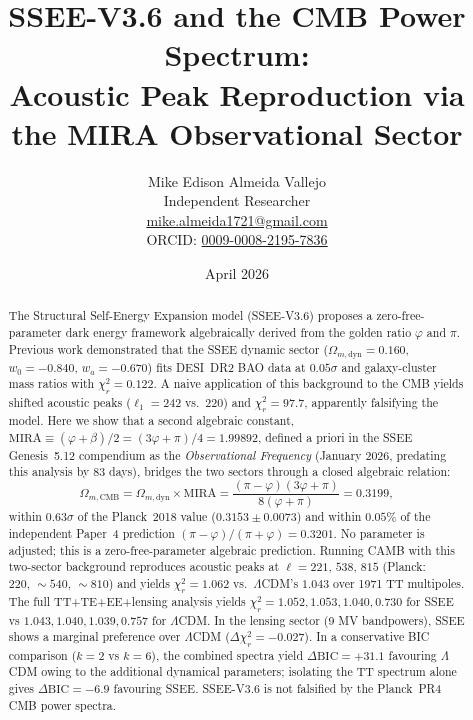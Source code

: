 \documentclass[12pt,a4paper]{article}
\title{\textbf{SSEE-V3.6 and the CMB Power Spectrum:\\
Acoustic Peak Reproduction via the MIRA Observational Sector}}
\author{Mike Edison Almeida Vallejo\\
\small Independent Researcher\\
\small \href{mailto:mike.almeida1721@gmail.com}{mike.almeida1721@gmail.com}\\
\small ORCID: \href{https://orcid.org/0009-0008-2195-7836}{0009-0008-2195-7836}}
\date{April 2026}
\begin{document}
\maketitle

\begin{abstract}
The Structural Self-Energy Expansion model (SSEE-V3.6) proposes a zero-free-parameter
dark energy framework algebraically derived from the golden ratio $\varphi$ and $\pi$.
Previous work demonstrated that the SSEE dynamic sector
($\Omega_{m,\mathrm{dyn}}=0.160$, $w_0=-0.840$, $w_a=-0.670$) fits DESI~DR2 BAO data
at $0.05\sigma$ and galaxy-cluster mass ratios with $\chi^2_r=0.122$.
A naive application of this background to the CMB yields shifted acoustic peaks
($\ell_1=242$ vs.\ $220$) and $\chi^2_r=97.7$, apparently falsifying the model.
Here we show that a second algebraic constant,
$\mathrm{MIRA}\equiv(\varphi+\beta)/2=(3\varphi+\pi)/4=1.99892$,
defined a priori in the SSEE Genesis~5.12 compendium as the
\textit{Observational Frequency} (January 2026, predating this analysis by 83 days),
bridges the two sectors through a closed algebraic relation:
\begin{equation*}
  \Omega_{m,\mathrm{CMB}}
  = \Omega_{m,\mathrm{dyn}} \times \mathrm{MIRA}
  = \frac{(\pi-\varphi)(3\varphi+\pi)}{8(\varphi+\pi)} = 0.3199,
\end{equation*}
within $0.63\sigma$ of the Planck~2018 value ($0.3153\pm0.0073$) and within $0.05\%$
of the independent Paper~4 prediction $(\pi-\varphi)/(\pi+\varphi)=0.3201$.
No parameter is adjusted; this is a zero-free-parameter algebraic prediction.
Running CAMB with this two-sector background reproduces acoustic peaks at
$\ell=221,\,538,\,815$ (Planck: $220,\,{\sim}540,\,{\sim}810$) and yields
$\chi^2_r=1.062$ vs.\ $\Lambda$CDM's $1.043$ over 1971 TT multipoles.
The full TT+TE+EE+lensing analysis yields $\chi^2_r = 1.052, 1.053, 1.040, 0.730$
for SSEE vs $1.043, 1.040, 1.039, 0.757$ for $\Lambda$CDM.
In the lensing sector (9 MV bandpowers), SSEE shows a marginal preference
over $\Lambda$CDM ($\Delta\chi^2_r = -0.027$).
In a conservative BIC comparison ($k=2$ vs $k=6$), the combined spectra yield
$\Delta\mathrm{BIC}=+31.1$ favouring $\Lambda$CDM owing to the additional dynamical
parameters; isolating the TT spectrum alone gives $\Delta\mathrm{BIC}=-6.9$ favouring SSEE.
SSEE-V3.6 is not falsified by the Planck~PR4 CMB power spectra.
\end{abstract}

\tableofcontents
\newpage

\end{document}
